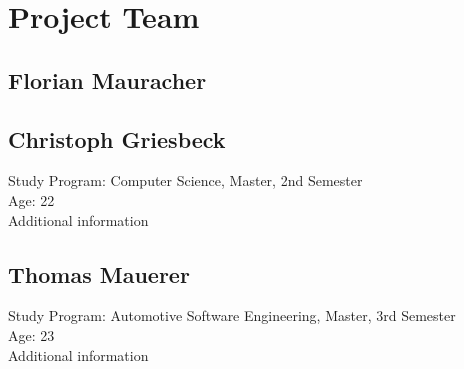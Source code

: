 \section{Project Team}
\subsection{Florian Mauracher}

\subsection{Christoph Griesbeck}
Study Program: Computer Science, Master, 2nd Semester \\
Age: 22 \\
Additional information 

\subsection{Thomas Mauerer}
Study Program: Automotive Software Engineering, Master, 3rd Semester \\
Age: 23 \\
Additional information 

